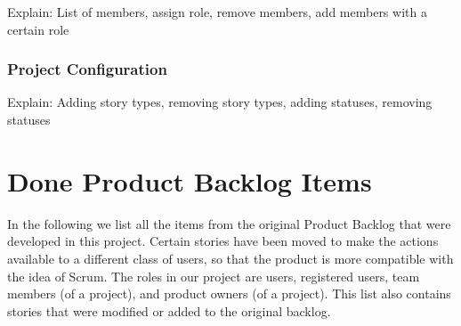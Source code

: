 \documentclass[
	accentcolor=tud1a %
]{tudreport}
\begin{document}
Explain: List of members, assign role, remove members, add members with a certain role

\subsection{Project Configuration}
\label{sec:proj-config}

Explain: Adding story types, removing story types, adding statuses, removing statuses

\chapter{Done Product Backlog Items}
\label{ch:done-pbis}

In the following we list all the items from the original Product Backlog that were developed in this project. Certain stories have been moved to make the actions available to a different class of users, so that the product is more compatible with the idea of Scrum. The roles in our project are users, registered users, team members (of a project), and product owners (of a project). This list also contains stories that were modified or added to the original backlog.

\end{document}
